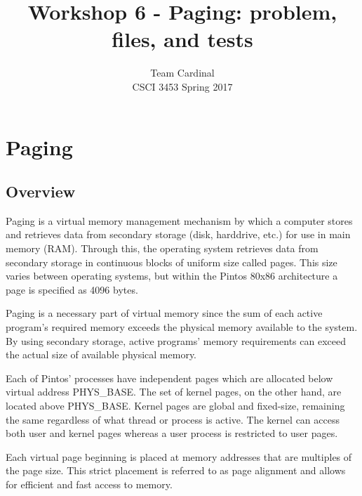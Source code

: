 \documentclass[11pt, letterpaper]{article}
\begin{document}

\title{Workshop 6 - Paging: problem, files, and tests}
\author{Team Cardinal\\CSCI 3453 Spring 2017}
\maketitle




\section{Paging}

\subsection{Overview}
Paging is a virtual memory management mechanism by which a computer stores and retrieves data from secondary storage (disk, harddrive, etc.) for use in main memory (RAM). Through this,  the operating system retrieves data from secondary storage in continuous blocks of uniform size called pages. This size varies between operating systems, but within the Pintos 80x86 architecture a page is specified as 4096 bytes.   

Paging is a necessary part of virtual memory  since the sum of each active program’s required memory exceeds the physical memory available to the system. By using secondary storage, active programs’ memory requirements can exceed the actual size of available physical memory.

Each of Pintos' processes have independent pages which are allocated below virtual address PHYS\_BASE. The set of kernel pages, on the other hand, are located above PHYS\_BASE. Kernel pages are global and fixed-size, remaining the same regardless of what thread or process is active. The kernel can access both user and   kernel pages whereas a user process is restricted to user pages.
   
Each virtual page beginning is placed at memory addresses  that are multiples of the page size. This strict placement is referred to as  page alignment and allows for efficient and fast access to memory. 
\end{document}

